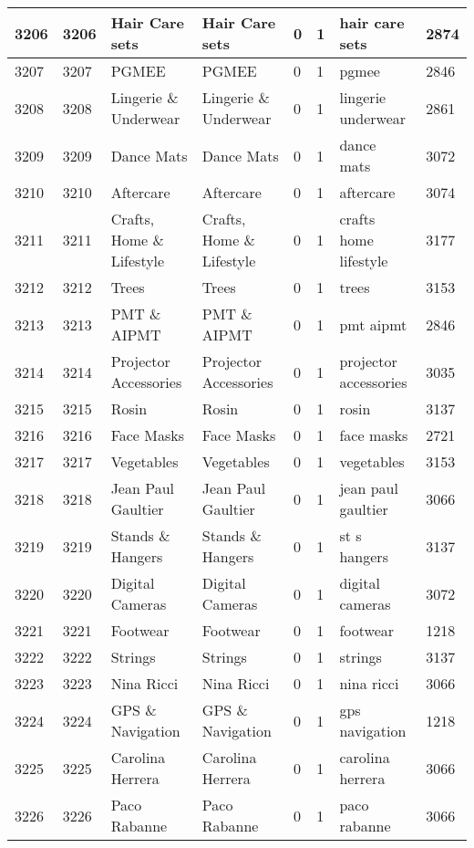 \begin{longtable}{|l|l|l|l|l|l|l|l|}
3206 & 3206 & Hair Care sets & Hair Care sets & 0 & 1 & hair care sets & 2874 \\ \hline 
3207 & 3207 & PGMEE & PGMEE & 0 & 1 & pgmee & 2846 \\ \hline 
3208 & 3208 & Lingerie \& Underwear & Lingerie \& Underwear & 0 & 1 & lingerie underwear & 2861 \\ \hline 
3209 & 3209 & Dance Mats & Dance Mats & 0 & 1 & dance mats & 3072 \\ \hline 
3210 & 3210 & Aftercare & Aftercare & 0 & 1 & aftercare & 3074 \\ \hline 
3211 & 3211 & Crafts, Home \& Lifestyle & Crafts, Home \& Lifestyle & 0 & 1 & crafts home lifestyle & 3177 \\ \hline 
3212 & 3212 & Trees & Trees & 0 & 1 & trees & 3153 \\ \hline 
3213 & 3213 & PMT \& AIPMT & PMT \& AIPMT & 0 & 1 & pmt aipmt & 2846 \\ \hline 
3214 & 3214 & Projector Accessories & Projector Accessories & 0 & 1 & projector accessories & 3035 \\ \hline 
3215 & 3215 & Rosin & Rosin & 0 & 1 & rosin & 3137 \\ \hline 
3216 & 3216 & Face Masks & Face Masks & 0 & 1 & face masks & 2721 \\ \hline 
3217 & 3217 & Vegetables & Vegetables & 0 & 1 & vegetables & 3153 \\ \hline 
3218 & 3218 & Jean Paul Gaultier & Jean Paul Gaultier & 0 & 1 & jean paul gaultier & 3066 \\ \hline 
3219 & 3219 & Stands \& Hangers & Stands \& Hangers & 0 & 1 & st s hangers & 3137 \\ \hline 
3220 & 3220 & Digital Cameras & Digital Cameras & 0 & 1 & digital cameras & 3072 \\ \hline 
3221 & 3221 & Footwear & Footwear & 0 & 1 & footwear & 1218 \\ \hline 
3222 & 3222 & Strings & Strings & 0 & 1 & strings & 3137 \\ \hline 
3223 & 3223 & Nina Ricci & Nina Ricci & 0 & 1 & nina ricci & 3066 \\ \hline 
3224 & 3224 & GPS \& Navigation & GPS \& Navigation & 0 & 1 & gps navigation & 1218 \\ \hline 
3225 & 3225 & Carolina Herrera & Carolina Herrera & 0 & 1 & carolina herrera & 3066 \\ \hline 
3226 & 3226 & Paco Rabanne & Paco Rabanne & 0 & 1 & paco rabanne & 3066 \\ \hline 

\end{longtable}
